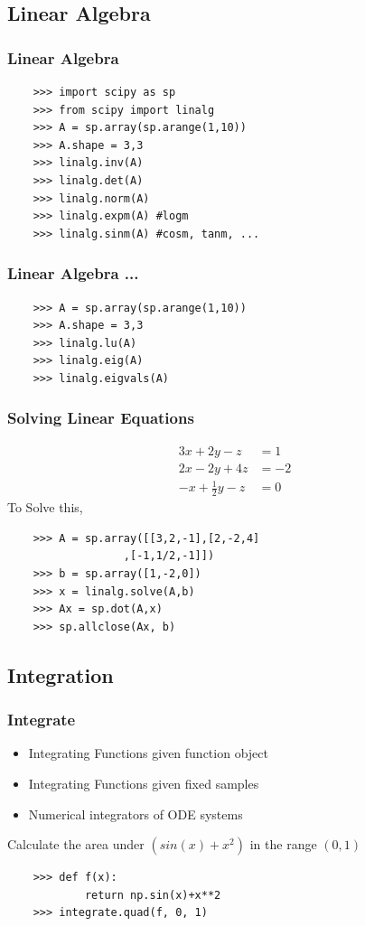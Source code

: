 \documentclass[14pt,compress]{beamer}
\newcounter{time}
\newcommand{\inctime}[1]{\addtocounter{time}{#1}{\tiny \thetime\ m}}
\begin{document}
\subsection{Linear Algebra}
\begin{frame}[fragile]
  \frametitle{Linear Algebra}
  \begin{lstlisting}
    >>> import scipy as sp
    >>> from scipy import linalg
    >>> A = sp.array(sp.arange(1,10))
    >>> A.shape = 3,3
    >>> linalg.inv(A)
    >>> linalg.det(A)
    >>> linalg.norm(A)
    >>> linalg.expm(A) #logm
    >>> linalg.sinm(A) #cosm, tanm, ...
  \end{lstlisting}
\end{frame}

\begin{frame}[fragile]
  \frametitle{Linear Algebra ...}
  \begin{lstlisting}
    >>> A = sp.array(sp.arange(1,10))
    >>> A.shape = 3,3
    >>> linalg.lu(A)
    >>> linalg.eig(A)
    >>> linalg.eigvals(A)
  \end{lstlisting}
\end{frame}

\begin{frame}[fragile]
  \frametitle{Solving Linear Equations}
  \vspace{-0.2in}
  \begin{align*}
    3x + 2y - z  & = 1 \\
    2x - 2y + 4z  & = -2 \\
    -x + \frac{1}{2}y -z & = 0
  \end{align*}
  To Solve this, 
  \begin{lstlisting}
    >>> A = sp.array([[3,2,-1],[2,-2,4]
                  ,[-1,1/2,-1]])
    >>> b = sp.array([1,-2,0])
    >>> x = linalg.solve(A,b)
    >>> Ax = sp.dot(A,x)
    >>> sp.allclose(Ax, b)
  \end{lstlisting}
\inctime{15}
\end{frame}

\subsection{Integration}
\begin{frame}[fragile]
  \frametitle{Integrate}
  \begin{itemize}
    \item Integrating Functions given function object
    \item Integrating Functions given fixed samples
    \item Numerical integrators of ODE systems
  \end{itemize}
  Calculate the area under $(sin(x) + x^2)$ in the range $(0,1)$
  \begin{lstlisting}
    >>> def f(x):
            return np.sin(x)+x**2
    >>> integrate.quad(f, 0, 1)
  \end{lstlisting}
\end{frame}
\end{document}
